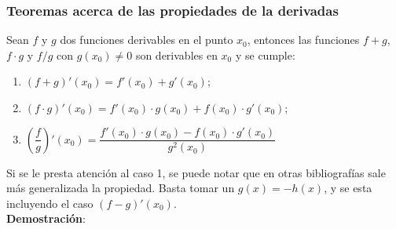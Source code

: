 \documentclass[10pt,twoside]{SelfArx} %
\begin{document}
\subsubsection{Teoremas acerca de las propiedades de la derivadas}
\begin{teorema}
	Sean $ f $ y $ g $ dos funciones derivables en el punto $ x_{0} $, entonces las funciones $ f+g $, $ f\cdot g $ y $ f/g $ con $ g(x_{0})\neq0 $ son derivables en $ x_{0} $ y se cumple:
	\begin{enumerate}
		\item $ (f+g)'(x_{0})=f'(x_{0})+g'(x_{0}) $;
		\item $ (f\cdot g)'(x_{0})=f'(x_{0})\cdot g(x_{0})+f(x_{0})\cdot g'(x_{0}) $;
		\item $ \left (\dfrac{f}{g}\right  )'(x_{0})=\dfrac{f'(x_{0})\cdot g(x_{0})-f(x_{0})\cdot g'(x_{0})}{g^{2}(x_{0})} $
	\end{enumerate}
\end{teorema}
Si se le presta atención al caso 1, se puede notar que en otras bibliografías sale más generalizada la propiedad. Basta tomar un $ g(x)=-h(x) $, y se esta incluyendo el caso $ (f-g)'(x_{0})$.\\
\textbf{Demostraci\'on}:\\
\end{document}
